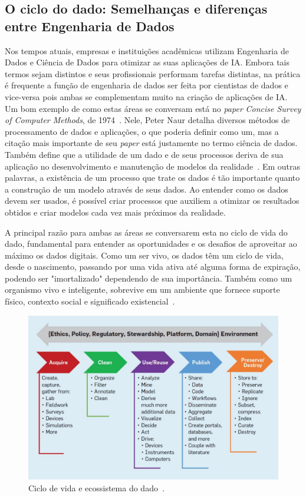 \documentclass[portugues]{ic-tese}
\begin{document}
\subsection{O ciclo do dado: Semelhanças e diferenças entre Engenharia de Dados}

Nos tempos atuais, empresas e instituições acadêmicas utilizam Engenharia de Dados e Ciência de Dados para otimizar as suas aplicações de IA. Embora tais termos sejam distintos e seus profissionais performam tarefas distintas, na prática é frequente a função de engenharia de dados ser feita por cientistas de dados e vice-versa pois ambas se complementam muito na criação de aplicações de IA. Um bom exemplo de como estas áreas se conversam está no \textit{paper} \textit{Concise Survey of Computer Methods}, de 1974~\citep{Panoply_2017}. Nele, Peter Naur detalha diversos métodos de processamento de dados e aplicações, o que poderia definir como um, mas a citação mais importante de seu \textit{paper} está justamente no termo ciência de dados. Também define que a utilidade de um dado e de seus processos deriva de sua aplicação no desenvolvimento e manutenção de modelos da realidade~\citep{Foote_2021}. Em outras palavras, a existência de um processo que trate os dados é tão importante quanto a construção de um modelo através de seus dados. Ao entender como os dados devem ser usados, é possível criar processos que auxiliem a otimizar os resultados obtidos e criar modelos cada vez mais próximos da realidade.

A principal razão para ambas as áreas se conversarem esta no ciclo de vida do dado, fundamental para entender as oportunidades e os desafios de aproveitar ao máximo os dados digitais. Como um ser vivo, os dados têm um ciclo de vida, desde o nascimento, passando por uma vida ativa até alguma forma de expiração, podendo ser "imortalizado" dependendo de sua importância. Também como um organismo vivo e inteligente, sobrevive em um ambiente que fornece suporte físico, contexto social e significado existencial~\citep{Berman_2018}.

\begin{figure}[h]
\centering
\includegraphics[scale=0.6]{images/data_life_cycle.jpg}
\caption {Ciclo de vida e ecossistema do dado~\citep{Berman_2018}.}
\label{fig:cicloDado}
\end{figure}
\end{document}
